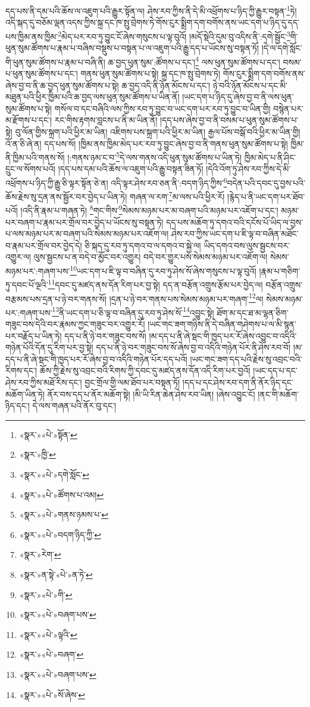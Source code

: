 དད་པས་ནི་དམ་པའི་ཆོས་ལ་འཇུག་པའི་རྒྱུར་སྟོན་ལ། ཤེས་རབ་ཀྱིས་ནི་དེ་མི་འཕྲོགས་པ་ཉིད་ཀྱི་རྒྱུར་བསྟན་\footnote{«སྣར་»«པེ་»སྟོན་}ཏེ། འདི་སྐད་དུ་བཅོམ་ལྡན་འདས་ཀྱིས་སྐྲ་དང་ཁ་སྤུ་བྲེགས་ཏེ་གོས་ངུར་སྨྲིག་དག་བགོས་ནས་ཡང་དག་པ་ཉིད་དུ་དད་པས་ཁྱིམ་ནས་ཁྱིམ་\footnote{«སྣར་»ཁྱི་}མེད་པར་རབ་ཏུ་བྱུང་ངོ་ཞེས་གསུངས་པ་ལྟ་བུའོ། །མདོ་སྡེའི་དུམ་བུ་འདིས་ནི་:དགེ་སྦྱོང་\footnote{«སྣར་»«པེ་»དགེ་སློང་}གི་ཕུན་སུམ་ཚོགས་པ་རྣམ་པ་བཞིས་བསྡུས་པ་བསྟན་པ་ལ་འཇུག་པའི་རྒྱུ་དད་པ་ཡོངས་སུ་བསྟན་ཏོ། །དེ་ལ་དགེ་སློང་གི་ཕུན་སུམ་ཚོགས་པ་རྣམ་པ་བཞི་ནི། ཆ་བྱད་ཕུན་སུམ་:ཚོགས་པ་དང་།\footnote{«སྣར་»«པེ་»ཚོགས་པ་འམ།} ལས་ཕུན་སུམ་ཚོགས་པ་དང་། བསམ་པ་ཕུན་སུམ་ཚོགས་པ་དང་། གནས་ཕུན་སུམ་ཚོགས་པ་སྟེ། སྐྲ་དང་ཁ་སྤུ་བྲེགས་ཏེ། གོས་ངུར་སྨྲིག་དག་བགོས་ནས་ཞེས་བྱ་བ་ནི་ཆ་བྱད་ཕུན་སུམ་ཚོགས་པ་སྟེ། ཆ་བྱད་འདི་ནི་ཉོན་མོངས་པ་དང་། ཉེ་བའི་ཉོན་མོངས་པ་དང་མི་མཐུན་པའི་ཕྱིར་ཁྱིམ་པའི་ཆ་བྱད་ལས་ཕུན་སུམ་ཚོགས་པ་ཡིན་ནོ། །ཡང་དག་པ་ཉིད་དུ་ཞེས་བྱ་བ་ནི་ལས་ཕུན་སུམ་ཚོགས་པ་སྟེ། གསོལ་བ་དང་བཞིའི་ལས་ཀྱིས་རབ་ཏུ་བྱུང་བ་ཡང་དག་པར་རབ་ཏུ་བྱུང་བ་ཡིན་གྱི། བསྙེན་པར་མ་རྫོགས་པ་དང་། རང་གིས་རྟགས་བླངས་པ་ནི་མ་ཡིན་ནོ། །དད་པས་ཞེས་བྱ་བ་ནི་བསམ་པ་ཕུན་སུམ་ཚོགས་པ་སྟེ། བུ་ལོན་གྱིས་སྐྲག་པའི་ཕྱིར་མ་ཡིན། འཇིགས་པས་སྐྲག་པའི་ཕྱིར་མ་ཡིན། རྒྱལ་པོས་བསྒོ་བའི་ཕྱིར་མ་ཡིན་གྱི། འོ་ན་ཅི་ཞེ་ན། དད་པས་སོ། །ཁྱིམ་ནས་ཁྱིམ་མེད་པར་རབ་ཏུ་བྱུང་ཞེས་བྱ་བ་ནི་གནས་ཕུན་སུམ་ཚོགས་པ་སྟེ། ཁྱིམ་ནི་ཁྱིམ་པའི་གནས་སོ། །:གནས་ཉམ་ང་བ་\footnote{«སྣར་»«པེ་»གནས་ཉམས་པ་}དེ་ལས་གནས་འདི་ཕུན་སུམ་ཚོགས་པ་ཡིན་ཏེ། ཁྱིམ་མེད་པ་ནི་ཤིང་དྲུང་ལ་སོགས་པའོ། །དད་པས་དམ་པའི་ཆོས་ལ་འཇུག་པའི་རྒྱུ་བསྟན་ཟིན་ཏོ། །དེའི་འོག་ཏུ་ཤེས་རབ་ཀྱིས་དེ་མི་འཕྲོགས་པ་ཉིད་ཀྱི་རྒྱུ་ཅི་ལྟར་སྟོན་ཅེ་ན། འདི་ལྟར་ཤེས་རབ་ཅན་ནི་:བདག་ཉིད་ཀྱིས་\footnote{«སྣར་»«པེ་»བདག་ཉིད་ཀྱི་}བདེན་པའི་དབང་དུ་བྱས་པའི་ཆོས་རྗེས་སུ་དྲན་ནས་སྦྱོར་བར་བྱེད་པ་ཡིན་ཏེ། གཞན་ལ་རག་\footnote{«སྣར་»རེག་}མ་ལས་པའི་ཕྱིར་རོ། །རྙེད་པ་ནི་ཡང་དག་པར་ཐོབ་པའོ། །འདི་ནི་རྣམ་པ་གཞན་ཏེ། \footnote{«སྣར་»ན་སྟེ་«པེ་»ན་ཏེ་}གང་གིས་\footnote{«སྣར་»«པེ་»གི་}སེམས་མཉམ་པར་མ་བཞག་པའི་མཉམ་པར་འཇོག་པ་དང་། མཉམ་པར་བཞག་པ་རྣམ་པར་གྲོལ་བར་བྱེད་པ་ཡོངས་སུ་བསྟན་ཏེ། དད་པས་མཆོག་ཏུ་དགའ་བའི་དངོས་པོ་ཡིད་ལ་བྱས་པ་ལས་མཉམ་པར་མ་བཞག་པའི་སེམས་མཉམ་པར་འཇོག་ལ། ཤེས་རབ་ཀྱིས་ཡང་དག་པ་ཇི་ལྟ་བ་བཞིན་མཐོང་བ་རྣམ་པར་གྲོལ་བར་བྱེད་དེ། ཅི་སྐད་དུ་རབ་ཏུ་དགའ་བ་ལ་དགའ་བ་སྐྱེ་ལ། ཡིད་དགའ་བས་ལུས་སྦྱངས་བར་འགྱུར་ལ། ལུས་སྦྱངས་པ་ན་བདེ་བ་མྱོང་བར་འགྱུར། བདེ་བར་གྱུར་པས་སེམས་མཉམ་པར་འཇོག་ལ། སེམས་མཉམ་པར་:གཞག་པས་\footnote{«སྣར་»«པེ་»བཞག་པས་}ཡང་དག་པ་ཇི་ལྟ་བ་བཞིན་དུ་རབ་ཏུ་ཤེས་སོ་ཞེས་གསུངས་པ་ལྟ་བུའོ། །རྣམ་པ་གཅིག་ཏུ་དབང་པོ་ལྔའི་\footnote{«སྣར་»«པེ་»ལྟའི་}དབང་དུ་མཛད་ནས་དོན་རིག་པར་བྱ་སྟེ། དད་ན་བརྩོན་འགྲུས་རྩོམ་པར་བྱེད་ལ། བརྩོན་འགྲུས་བརྩམས་པས་དྲན་པ་ཉེ་བར་གནས་སོ། །དྲན་པ་ཉེ་བར་གནས་པས་སེམས་མཉམ་པར་གཞག་\footnote{«སྣར་»«པེ་»བཞག་}ལ། སེམས་མཉམ་པར་:གཞག་པས་\footnote{«སྣར་»«པེ་»བཞག་པས་}ནི་ཡང་དག་པ་ཅི་ལྟ་བ་བཞིན་དུ་རབ་ཏུ་ཤེས་སོ་\footnote{«སྣར་»«པེ་»སོ་ཞེས་}འབྱུང་སྟེ། ཐོག་མ་དང་ཐ་མ་ལྷན་ཅིག་གཟུང་བས་དེའི་བར་རྣམས་ཀྱང་གཟུང་བར་འགྱུར་རོ། །ཡང་གང་ཟག་གཉིས་ནི་དེ་བཞིན་གཤེགས་པ་ལ་མི་སྙན་པར་བརྗོད་པ་ཡིན་ཏེ། དད་པ་ནི་ཉེ་བར་གཟུང་བས་སོ། །མ་དད་པ་ནི་ཞེ་སྡང་གི་ཁྱད་པར་རོ་ཞེས་འབྱུང་བ་འདིའི་གཉེན་པོའི་དོན་དུ་རིག་པར་བྱ་སྟེ། དད་པ་ནི་ཉེ་བར་གཟུང་བས་སོ་ཞེས་བྱ་བ་འདིའི་གཉེན་པོར་ནི་ཤེས་རབ་བོ། །མ་དད་པ་ནི་ཞེ་སྡང་གི་ཁྱད་པར་རོ་ཞེས་བྱ་བ་འདིའི་གཉེན་པོར་དད་པའོ། །ཡང་གང་ཟག་དད་པའི་རྗེས་སུ་འབྲང་བའི་རིགས་དང་། ཆོས་ཀྱི་རྗེས་སུ་འབྲང་བའི་རིགས་ཀྱི་དབང་དུ་མཛད་ནས་དོན་འདི་རིག་པར་བྱའོ། །ཡང་དད་པ་དང་ཤེས་རབ་ཀྱིས་མཐོ་རིས་དང་། བྱང་གྲོལ་གྱི་ལམ་ཐོབ་པར་བསྟན་ཏོ། །དད་པ་དང་ཤེས་རབ་དག་ནི་ནོར་ཉིད་དང་མཆོག་ཡིན་ཏེ། ནོར་བས་དད་པ་ནོར་མཆོག་སྟེ། །མི་ཡི་རིན་ཆེན་ཤེས་རབ་ཡིན། །ཞེས་འབྱུང་ངོ། །ནང་གི་མཆོག་ཉིད་དང་། དེ་ལས་གཞན་པའི་ནོར་བུ་དང་། 